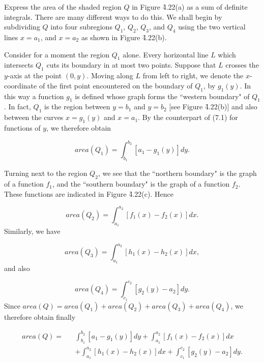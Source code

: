 \begin{example}
Express the area of the shaded region $Q$ in Figure \f{4.22}(a) as a sum of definite
integrals. There are many different ways to do this. We shall
begin by subdividing $Q$ into four subregions $Q_1$, $Q_2$, $Q_3$, and $Q_4$ using the two vertical lines $x = a_1$, and $x = a_2$ as shown in Figure \f{4.22}(b).

Consider for a moment the region $Q_1$ alone. Every horizontal line $L$ which intersects $Q_1$ cuts its boundary in at most two points. Suppose that $L$ crosses the $y$-axis at the point $(0, y)$. Moving along $L$ from left to right, we denote the $x$-coordinate of the first point encountered on the boundary of $Q_1$, by $g_{1}(y)$. In this way a function $g_{1}$ is defined whose graph forms the ``western boundary" of $Q_{1}$. In fact, $Q_1$ is the region between $y = b_1$ and $y = b_2$ [see Figure \f{4.22}(b)] and also between the curves $x = g_{1}(y)$ and $x = a_1$. By the counterpart of (7.1) for functions of $y$, we therefore obtain

\[
area(Q_1) = \int_{b_1}^{b_2} [a_1 - g_1(y)] dy.  
\]


Turning next to the region $Q_2$, we see that the ``northern boundary" is the graph of a function $f_1$, and the ``southern boundary" is the graph of a
function $f_2$. These functions are indicated in Figure \f{4.22}(c). Hence 

$$
area( Q_2) = \int_{a_1}^{a_2} [f_{1}(x) - f_{2}(x)]dx. 
$$
\noindent Similarly, we have 

$$
area(Q_3) = \int_{a_1}^{a_2} [h_{1}(x) - h_{2}(x)] dx, 
$$
\noindent and also 

\[
area(Q_4) = \int_{c_1}^{c_2}  [g_{2}(y) - a_{2}]dy.
\]
\noindent Since $area(Q) = area(Q_1) + area(Q_2) + area(Q_3) + area(Q_4)$, we therefore obtain finally

\begin{eqnarray*}
area(Q) =
&&
\int_{b_1}^{b_2} [a_{1} - g_{1}(y)] dy
+
\int_{a_1}^{a_2} [f_{1}(x) - f_{2}(x)] dx
\\
&&+
\int_{a_1}^{a_2} [h_{1}(x) - h_{2}(x)] dx
+ \int_{c_1}^{c_2} [g_{2}(y) - a_{2}] dy.
\end{eqnarray*}
 
\end{example}
